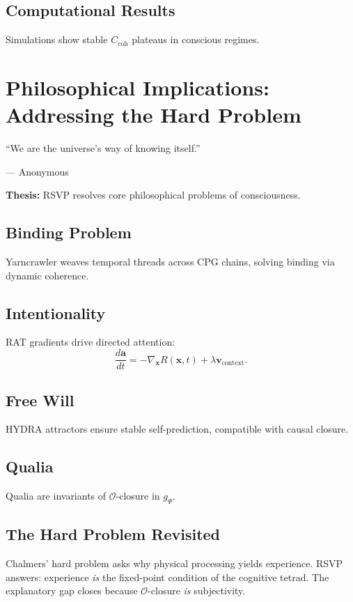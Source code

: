 \documentclass[12pt]{book}
\theoremstyle{definition}
\begin{document}
\section{Computational Results}
Simulations show stable \(C_{\text{coh}}\) plateaus in conscious regimes.

\chapter{Philosophical Implications: Addressing the Hard Problem}
\label{chap:philosophy}
\epigraph{``We are the universe’s way of knowing itself.''}{--- Anonymous}

\textbf{Thesis:} RSVP resolves core philosophical problems of consciousness.

\section{Binding Problem}
Yarncrawler weaves temporal threads across CPG chains, solving binding via dynamic coherence.

\section{Intentionality}
RAT gradients drive directed attention:
\begin{equation}
\frac{d\mathbf{a}}{dt} = -\nabla_{\mathbf{x}} R(\mathbf{x}, t) + \lambda \mathbf{v}_{\text{context}}.
\end{equation}

\section{Free Will}
HYDRA attractors ensure stable self-prediction, compatible with causal closure.

\section{Qualia}
Qualia are invariants of \(\mathcal{O}\)-closure in \(g_\Psi\).

\section{The Hard Problem Revisited}
Chalmers’ hard problem \cite{chalmers1996conscious} asks why physical processing yields experience. RSVP answers: experience \emph{is} the fixed-point condition of the cognitive tetrad. The explanatory gap closes because \(\mathcal{O}\)-closure \emph{is} subjectivity.
\end{document}
